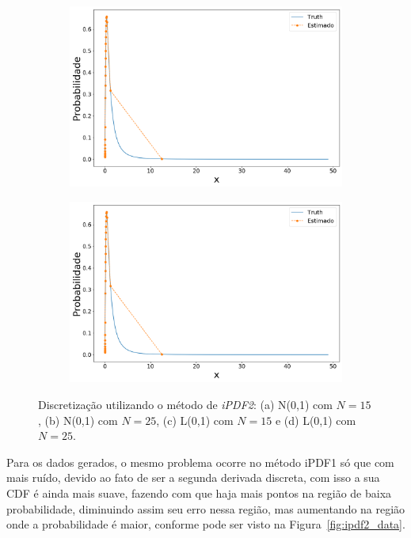 \begin{figure}[H]
	\begin{subfigure}[b]{0.45\textwidth}
		\centering 
		\includegraphics[width=\linewidth]{./figuras/iPDF2_lognormal_25_1_0_0}
		\caption{}
		\label{fig:ipdf2lognorm15}
	\end{subfigure}
	\hfill
	\begin{subfigure}[b]{0.45\textwidth}
		\centering 
		\includegraphics[width=\linewidth]{./figuras/iPDF2_lognormal_25_1_0_0}
		\caption{}
		\label{fig:ipdf2lognorm25}
	\end{subfigure}
	
	\caption{Discretização utilizando o método de \textit{iPDF2}: (a) N(0,1) com $N = 15$, (b) N(0,1) com $N = 25$, (c) L(0,1) com $N = 15$ e (d) L(0,1) com $N = 25$.}
	\label{fig:ipdf2norm}
\end{figure}

Para os dados gerados, o mesmo problema ocorre no método \ac{iPDF1} só que com mais ruído, devido ao fato de ser a segunda derivada discreta, com isso a sua CDF é ainda mais suave, fazendo com que haja mais pontos na região de baixa probabilidade, diminuindo assim seu erro nessa região, mas aumentando na região onde a probabilidade é maior, conforme pode ser visto na Figura~\ref{fig:ipdf2_data}.

